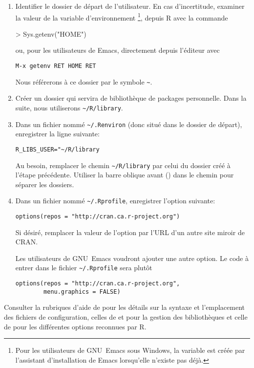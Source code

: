 \begin{enumerate}
\item Identifier le dossier de départ de l'utilisateur. En cas
  d'incertitude, examiner la valeur de la variable d'environnement
  \footnote{%
    Pour les utilisateurs de GNU~Emacs sous Windows, la variable est
    créée par l'assistant d'installation de Emacs lorsqu'elle n'existe
    pas déjà.}, %
  depuis R avec la commande
\begin{Schunk}
\begin{Sinput}
> Sys.getenv("HOME")
\end{Sinput}
\end{Schunk}
  ou, pour les utilisateurs de Emacs, directement depuis l'éditeur avec
\begin{verbatim}
M-x getenv RET HOME RET
\end{verbatim}
  Nous référerons à ce dossier par le symbole \verb=~=.
\item Créer un dossier qui servira de bibliothèque de packages
  personnelle. Dans la suite, nous utiliserons \verb=~/R/library=.
\item Dans un fichier nommé \verb=~/.Renviron= (donc situé dans le
  dossier de départ), enregistrer la ligne suivante:
\begin{verbatim}
R_LIBS_USER="~/R/library
\end{verbatim}
  Au besoin, remplacer le chemin \verb=~/R/library= par celui du
  dossier créé à l'étape précédente. Utiliser la barre oblique avant
  (\code{/}) dans le chemin pour séparer les dossiers.
\item Dans un fichier nommé \verb=~/.Rprofile=, enregistrer l'option
  suivante:
\begin{verbatim}
options(repos = "http://cran.ca.r-project.org")
\end{verbatim}
  Si désiré, remplacer la valeur de l'option  par l'URL
  d'un autre site miroir de CRAN.

  Les utilisateurs de GNU~Emacs voudront ajouter une autre option. Le
  code à entrer dans le fichier \verb=~/.Rprofile= sera plutôt
\begin{verbatim}
options(repos = "http://cran.ca.r-project.org",
        menu.graphics = FALSE)
\end{verbatim}
\end{enumerate}
Consulter la rubriques d'aide de  pour les détails sur
la syntaxe et l'emplacement des fichiers de configuration, celles de
 et  pour la gestion des bibliothèques
et celle de  pour les différentes options reconnues par
R.


